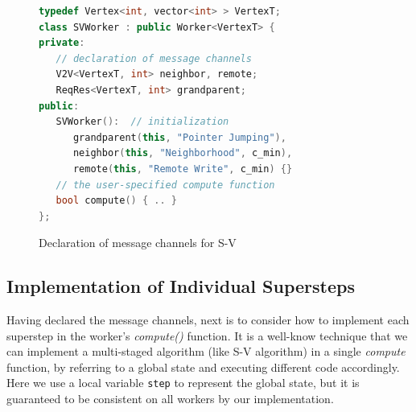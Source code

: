 \documentclass{sokendai_thesis} %
\begin{document}
\begin{figure}[ht]
\centering
\vspace{-2ex}
\begin{lstlisting}[basicstyle=\small\ttfamily,numbers=none,language=c++,
xleftmargin=0.1\textwidth]
typedef Vertex<int, vector<int> > VertexT;
class SVWorker : public Worker<VertexT> {
private:
   // declaration of message channels
   V2V<VertexT, int> neighbor, remote;
   ReqRes<VertexT, int> grandparent;
public:
   SVWorker():  // initialization
      grandparent(this, "Pointer Jumping"),
      neighbor(this, "Neighborhood", c_min),
      remote(this, "Remote Write", c_min) {}
   // the user-specified compute function
   bool compute() { .. }
};
\end{lstlisting}
\vspace{-2ex}
\caption{Declaration of message channels for S-V}
\label{fig:sv-declaration}
\end{figure}


\subsection{Implementation of Individual Supersteps}
\label{sec:sv-impl}

Having declared the message channels, next is to consider how to implement each superstep in the worker's \emph{compute()} function.
It is a well-know technique that we can implement a multi-staged algorithm (like S-V algorithm) in a single \emph{compute} function, by referring to a global state and executing different code accordingly.
Here we use a local variable \texttt{step} to represent the global state, but it is guaranteed to be consistent on all workers by our implementation.
\end{document}
